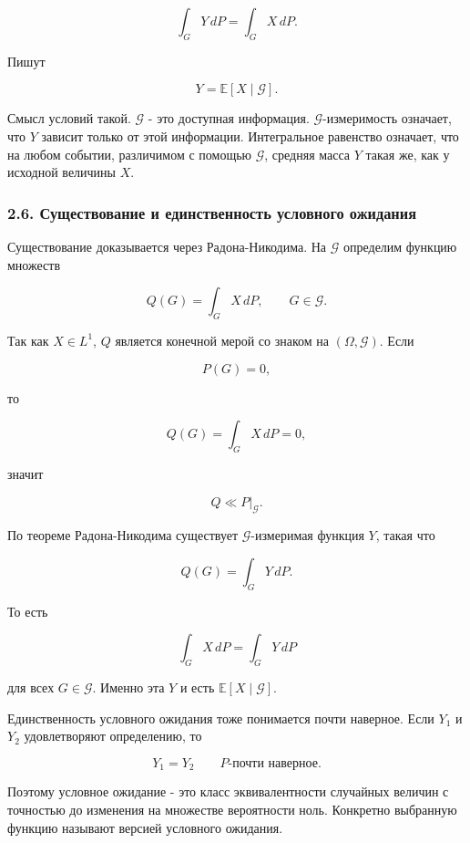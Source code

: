 \documentclass[
  11pt,
  a4paper,
]{article}
\begin{document}
\[
\int_G Y\,dP=\int_G X\,dP.
\]

Пишут

\[
Y=\mathbb E[X\mid\mathcal G].
\]

Смысл условий такой. \(\mathcal G\) - это доступная информация.
\(\mathcal G\)-измеримость означает, что \(Y\) зависит только от этой
информации. Интегральное равенство означает, что на любом событии,
различимом с помощью \(\mathcal G\), средняя масса \(Y\) такая же, как у
исходной величины \(X\).

\subsubsection{2.6. Существование и единственность условного
ожидания}\label{ux441ux443ux449ux435ux441ux442ux432ux43eux432ux430ux43dux438ux435-ux438-ux435ux434ux438ux43dux441ux442ux432ux435ux43dux43dux43eux441ux442ux44c-ux443ux441ux43bux43eux432ux43dux43eux433ux43e-ux43eux436ux438ux434ux430ux43dux438ux44f}

Существование доказывается через Радона-Никодима. На \(\mathcal G\)
определим функцию множеств

\[
Q(G)=\int_G X\,dP,
\qquad
G\in\mathcal G.
\]

Так как \(X\in L^1\), \(Q\) является конечной мерой со знаком на
\((\Omega,\mathcal G)\). Если

\[
P(G)=0,
\]

то

\[
Q(G)=\int_G X\,dP=0,
\]

значит

\[
Q\ll P|_{\mathcal G}.
\]

По теореме Радона-Никодима существует \(\mathcal G\)-измеримая функция
\(Y\), такая что

\[
Q(G)=\int_G Y\,dP.
\]

То есть

\[
\int_G X\,dP=\int_G Y\,dP
\]

для всех \(G\in\mathcal G\). Именно эта \(Y\) и есть
\(\mathbb E[X\mid\mathcal G]\).

Единственность условного ожидания тоже понимается почти наверное. Если
\(Y_1\) и \(Y_2\) удовлетворяют определению, то

\[
Y_1=Y_2
\qquad P\text{-почти наверное}.
\]

Поэтому условное ожидание - это класс эквивалентности случайных величин
с точностью до изменения на множестве вероятности ноль. Конкретно
выбранную функцию называют версией условного ожидания.
\end{document}

